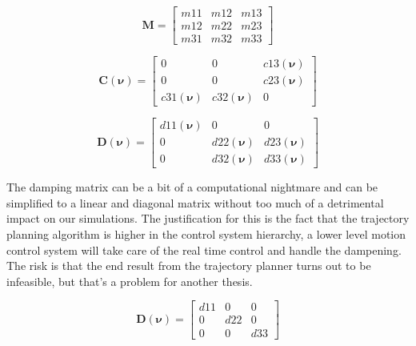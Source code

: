 \begin{equation} \label{EQ: Mass}
    \textbf{M} = \begin{bmatrix}
                m11 &   m12 &   m13\\
                m12 &   m22 &   m23\\
                m31 &   m32 &   m33
                 \end{bmatrix}
\end{equation}

\begin{equation} \label{EQ: Coriolis}
    \textbf{C}(\bm{\nu}) =  \begin{bmatrix}
        0             &     0       &   c13(\bm{\nu})\\
        0             &     0       &   c23(\bm{\nu})\\
        c31(\bm{\nu}) &c32(\bm{\nu})&   0
                            \end{bmatrix}    
\end{equation}

\begin{equation} \label{EQ: Dampening}
    \textbf{D}(\bm{\nu}) =  \begin{bmatrix}
        d11(\bm{\nu}) &     0       &   0\\
        0             &d22(\bm{\nu})&d23(\bm{\nu})\\
        0             &d32(\bm{\nu})&d33(\bm{\nu})
                            \end{bmatrix}       
\end{equation}

The damping matrix can be a bit of a computational nightmare and can be simplified to a linear and diagonal matrix without too much
of a detrimental impact on our simulations. The justification for this is the fact that the trajectory planning algorithm is higher in
the control system hierarchy, a lower level motion control system will take care of the real time control and handle the dampening.
The risk is that the end result from the trajectory planner turns out to be infeasible, but that's a problem for another thesis.

\begin{equation} \label{EQ: Dampening_Simple}
    \textbf{D}(\bm{\nu}) = \begin{bmatrix}
                            d11 &   0   &   0\\
                            0   &   d22 &   0\\
                            0   &   0   &   d33
                            \end{bmatrix}
\end{equation}

